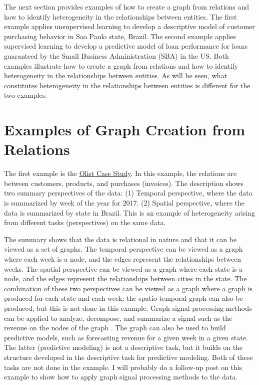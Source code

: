 \documentclass{article}
\begin{document}
The next section provides examples of how to create a graph from relations and how to identify heterogeneity in the relationships between entities. The first example applies unsupervised learning to develop a descriptive model of customer purchasing behavior in Sao Paulo state, Brazil. The second example applies supervised learning to develop a predictive model of loan performance for loans guaranteed by the Small Business Administration (SBA) in the US. Both examples illustrate how to create a graph from relations and how to identify heterogeneity in the relationships between entities. As will be seen, what constitutes heterogeneity in the relationships between entities is different for the two examples.


\section{Examples of Graph Creation from Relations}

The first example is the \href{https://github.com/rajivsam/descriptive_analytics/blob/main/examples/olist_case_study/picture_summary_SP_2017.md}{Olist Case Study}. In this example, the relations are between customers, products, and purchases (invoices). The description shows two summary perspectives of the data: (1) Temporal perspective, where the data is summarized by week of the year for 2017. (2) Spatial perspective, where the data is summarized by state in Brazil. This is an example of heterogeneity arising from different tasks (perspectives) on the same data.

The summary shows that the data is relational in nature and that it can be viewed as a set of graphs. The temporal perspective can be viewed as a graph where each week is a node, and the edges represent the relationships between weeks. The spatial perspective can be viewed as a graph where each state is a node, and the edges represent the relationships between cities in the state. The combination of these two perspectives can be viewed as a graph where a graph is produced for each state and each week; the spatio-temporal graph can also be produced, but this is not done in this example. Graph signal processing methods can be applied to analyze, decompose, and summarize a signal such as the revenue on the nodes of the graph \cite{byrne2014signal}. The graph can also be used to build predictive models, such as forecasting revenue for a given week in a given state. The latter (predictive modeling) is not a descriptive task, but it builds on the structure developed in the descriptive task for predictive modeling. Both of these tasks are not done in the example. I will probably do a follow-up post on this example to show how to apply graph signal processing methods to the data.
\end{document}
